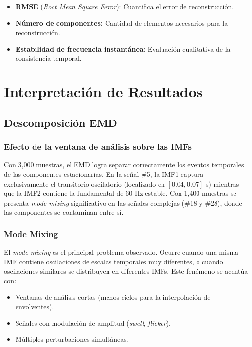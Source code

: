 \documentclass[12pt,a4paper]{article}
\begin{document}
\begin{itemize}
    \item \textbf{RMSE} (\textit{Root Mean Square Error}): Cuantifica el error de reconstrucción.
    \item \textbf{Número de componentes:} Cantidad de elementos necesarios para la reconstrucción.
    \item \textbf{Estabilidad de frecuencia instantánea:} Evaluación cualitativa de la consistencia temporal.
\end{itemize}


\section{Interpretación de Resultados}

\subsection{Descomposición EMD}

\subsubsection{Efecto de la ventana de análisis sobre las IMFs}

Con 3{,}000 muestras, el EMD logra separar correctamente los eventos temporales de las componentes estacionarias. En la señal \#5, la IMF1 captura exclusivamente el transitorio oscilatorio (localizado en $[0.04, 0.07]$ s) mientras que la IMF2 contiene la fundamental de 60 Hz estable. Con 1{,}400 muestras se presenta \textit{mode mixing} significativo en las señales complejas (\#18 y \#28), donde las componentes se contaminan entre sí.

\subsubsection{Mode Mixing}

El \textit{mode mixing} es el principal problema observado. Ocurre cuando una misma IMF contiene oscilaciones de escalas temporales muy diferentes, o cuando oscilaciones similares se distribuyen en diferentes IMFs. Este fenómeno se acentúa con:
\begin{itemize}
    \item Ventanas de análisis cortas (menos ciclos para la interpolación de envolventes).
    \item Señales con modulación de amplitud (\textit{swell}, \textit{flicker}).
    \item Múltiples perturbaciones simultáneas.
\end{itemize}
\end{document}
